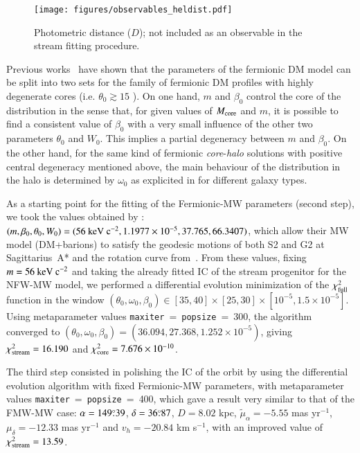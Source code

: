 \documentclass[twocolumn]{aa}
\begin{document}
\begin{figure}
   \texttt{[image: figures/observables\_heldist.pdf]}
   \caption{Photometric distance ($D$); not included as an observable in the stream fitting procedure.}
   \label{fig:obs_radial}
\end{figure}
Previous works~\citep{arguelles_novel_2018,2019PDU....24..278A,2023ApJ...945....1K} have shown that the parameters of the fermionic DM model can be split into two sets for the family of fermionic DM profiles with highly degenerate cores (i.e. $\theta_0 \gtrsim 15$ \citealp{2019PDU....24..278A}). On one hand, $m$ and $\beta_0$ control the core of the distribution in the sense that, for given values of $M_{\rm{core}}$ and $m$, it is possible to find a consistent value of $\beta_0$ with a very small influence of the other two parameters $\theta_0$ and $W_0$. This implies a partial degeneracy between $m$ and $\beta_0$.
On the other hand, for the same kind of fermionic \textit{core}-\textit{halo} solutions with positive central degeneracy mentioned above, the main behaviour of the distribution in the halo is determined by $\omega_0$ as explicited in \cite{2019PDU....24..278A} for different galaxy types.

As a starting point for the fitting of the Fermionic-MW parameters (second step), we took the values obtained by \citet{2020A&A...641A..34B}: $(m, \beta_0, \theta_0, W_0)=(56~\rm{keV}~c^{-2}, 1.1977\times10^{-5}, 37.765, 66.3407)$, which allow their MW model (DM+barions) to satisfy the geodesic motions of both S2 and G2 at Sagittarius~A* and the rotation curve from~\citet{sofue_rotation_2013}.
From these values, fixing $m=56~\rm{keV}~c^{-2}$ and taking the already fitted IC of the stream progenitor for the NFW-MW model, we performed a differential evolution minimization of the
$\chi^2_{\rm{full}}$ function in the window
$(\theta_0,\omega_0, \beta_0)\in [35, 40]\times[25, 30]\times[10^{-5}, 1.5\times10^{-5}]$. Using metaparameter values \texttt{maxiter}$~=~$\texttt{popsize}$~=~$300, the algorithm converged to
$(\theta_0, \omega_0, \beta_0)= (36.094, 27.368 , 1.252\times10^{-5})$, giving
$\chi^2_{\rm{stream}}= 16.190$ and  $\chi^2_{\rm{core}}= 7.676\times10^{-10}$.

The third step consisted in polishing the IC of the orbit by using the differential evolution algorithm with fixed Fermionic-MW parameters, with metaparameter values \texttt{maxiter}$~=~$\texttt{popsize}$~=~$400, which gave a result very similar to that of the FMW-MW case:
$\alpha=149\overset{\circ}{.} 39$, $\delta=36\overset{\circ}{.} 87$, $D=8.02$ kpc,
$\tilde{\mu}_\alpha=-5.55$ mas yr$^{-1}$, $\mu_\delta=-12.33$ mas yr$^{-1}$ and $v_h=-20.84$ km s$^{-1}$, with an improved value of $\chi^2_{\rm{stream}}= 13.59$.
\end{document}
